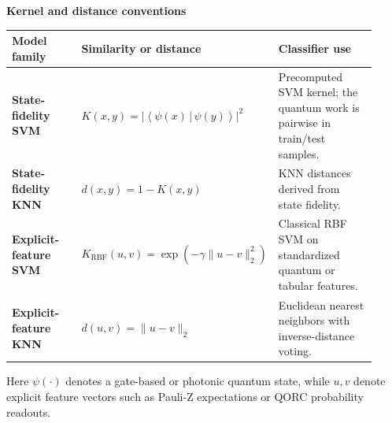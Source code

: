 \documentclass{article}
\begin{document}
\sffamily

{\Large\bfseries\color{header} Kernel and distance conventions}

\vspace{0.35cm}

\renewcommand{\arraystretch}{1.55}
\begin{tabular}{>{\bfseries}p{0.23\linewidth} p{0.34\linewidth} p{0.35\linewidth}}
\toprule
Model family & Similarity or distance & Classifier use \\
\midrule
State-fidelity SVM &
$K(x,y)=\left|\left\langle\psi(x)\,\vert\,\psi(y)\right\rangle\right|^2$ &
Precomputed SVM kernel; the quantum work is pairwise in train/test samples. \\
\addlinespace
State-fidelity KNN &
$d(x,y)=1-K(x,y)$ &
KNN distances derived from state fidelity. \\
\addlinespace
Explicit-feature SVM &
$K_{\mathrm{RBF}}(u,v)=\exp\!\left(-\gamma\lVert u-v\rVert_2^2\right)$ &
Classical RBF SVM on standardized quantum or tabular features. \\
\addlinespace
Explicit-feature KNN &
$d(u,v)=\lVert u-v\rVert_2$ &
Euclidean nearest neighbors with inverse-distance voting. \\
\bottomrule
\end{tabular}

\vspace{0.25cm}
{\small\color{textgray}
Here $\psi(\cdot)$ denotes a gate-based or photonic quantum state, while
$u,v$ denote explicit feature vectors such as Pauli-Z expectations or QORC
probability readouts.}
\end{document}
